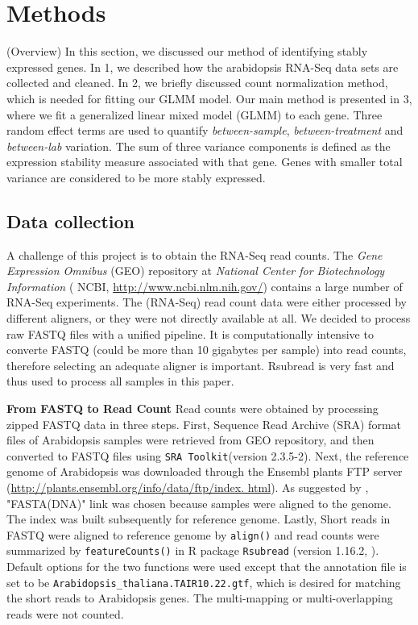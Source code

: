 \documentclass[11pt, a4paper]{article}
\begin{document}
\section{Methods} \label{Methods}
(Overview) In this section, we discussed our method of identifying stably expressed genes. In 1, we described how the arabidopsis RNA-Seq data sets are collected and cleaned. In 2, we briefly discussed count normalization method, which is needed for fitting our GLMM model. Our main method is presented in 3, where we fit a generalized linear mixed model (GLMM) \citep{mccullagh1989generalized} to each gene. Three random effect terms are used to quantify \textit{between-sample}, \textit{between-treatment} and \textit{between-lab} variation. The sum of three variance components is defined as the expression stability measure associated with that gene. Genes with smaller total variance are considered to be more stably expressed. 



\subsection{Data collection}\label{dataCollection}
 A challenge of this project is to obtain the RNA-Seq read counts. The \textit{Gene Expression Omnibus} (GEO) repository at \textit{National Center for Biotechnology Information} ( NCBI, \url{http://www.ncbi.nlm.nih.gov/}) contains a large number of RNA-Seq experiments. The (RNA-Seq) read count data were either processed by different aligners, or they were not directly available at all. We decided to process raw FASTQ files with a unified pipeline. It is computationally intensive to converte FASTQ (could be more than 10 gigabytes per sample) into read counts, therefore selecting an adequate aligner is important. Rsubread \citep{liao2013subread} is very fast and thus used to process all samples in this paper.

\textbf{From FASTQ to Read Count} Read counts were obtained by processing
zipped FASTQ data in three steps. First, Sequence Read Archive (SRA) format
files of Arabidopsis samples were retrieved from GEO repository, and then converted to
FASTQ files using \verb"SRA Toolkit"(version 2.3.5-2). Next, the reference
genome of Arabidopsis was downloaded  through the Ensembl plants FTP server
(\url{http://plants.ensembl.org/info/data/ftp/index. html}). As suggested by
\cite{anders2013count}, "FASTA(DNA)" link was chosen because samples were aligned 
to the genome.
The index  was built subsequently for reference genome.  Lastly, Short reads
in FASTQ were  aligned to reference genome by  \verb"align()" and read counts
were summarized by \verb"featureCounts()" in R package \verb"Rsubread"
(version 1.16.2,  \cite{liao2013subread}). Default options for the two functions were used except that
the annotation file is set to be \verb"Arabidopsis_thaliana.TAIR10.22.gtf", which is desired for matching the short reads to Arabidopsis genes.
The multi-mapping or multi-overlapping reads were not counted.
\end{document}
